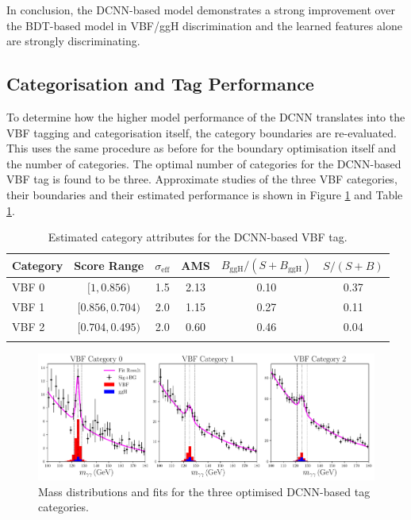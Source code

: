 In conclusion, the DCNN-based model demonstrates a strong improvement over the BDT-based model in VBF/ggH discrimination and the learned features alone are strongly discriminating. 












\subsection{Categorisation and Tag Performance}
To determine how the higher model performance of the DCNN translates into the VBF tagging and categorisation itself, the category boundaries are re-evaluated. 
This uses the same procedure as before for the boundary optimisation itself and the number of categories. 
The optimal number of categories for the DCNN-based VBF tag is found to be three.
Approximate studies of the three VBF categories, their boundaries and their estimated performance is shown in Figure \ref{fig:event_categorisation:DCNN_mass_fits} and Table \ref{tab:event_selection:DCNN_cats}.
\begin{table}[h!]
    \centering
    \renewcommand{\arraystretch}{1.3}
    \begin{tabular}{ l | c c c c c }
        \thickhline
        Category & Score Range & $\sigma_{\mathrm{eff}}$ & AMS & $B_{\mathrm{ggH}}/(S+B_{\mathrm{ggH}})$ & $S/(S+B)$ \\
        \hline
        VBF 0 & $[1, 0.856)$     & 1.5 &  2.13 & 0.10 & 0.37 \\
        VBF 1 & $[0.856, 0.704)$ & 2.0 &  1.15  & 0.27 & 0.11 \\
        VBF 2 & $[0.704, 0.495)$ & 2.0 &  0.60 & 0.46 & 0.04 \\
        \thickhline
    \end{tabular}
    \caption{Estimated category attributes for the DCNN-based VBF tag.}
    \label{tab:event_selection:DCNN_cats}
\end{table}
\begin{figure}[h!]
    \centering
    \includegraphics[width=1.0\textwidth]{figures/event_selection/DCNN_mass_fits.pdf}
    \caption{Mass distributions and fits for the three optimised DCNN-based tag categories.}
    \label{fig:event_categorisation:DCNN_mass_fits}
\end{figure}

